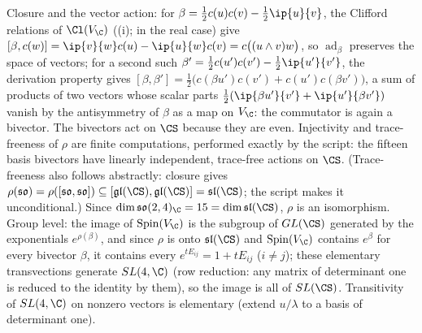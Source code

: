 Closure and the vector action: for $\beta = \tfrac12 c(u)c(v) - \tfrac12\ip{u}{v}$, the Clifford relations of $\Cl(V_\C)$ ((i);  in the real case) give $[\beta, c(w)] = \ip{v}{w}c(u) - \ip{u}{w}c(v) = c\bigl((u\wedge v)w\bigr)$, so $\operatorname{ad}_\beta$ preserves the space of vectors; for a second such $\beta'= \tfrac12 c(u')c(v') - \tfrac12\ip{u'}{v'}$, the derivation property gives $[\beta, \beta'] = \tfrac12\bigl(c(\beta u')c(v') + c(u')c(\beta v')\bigr)$, a sum of products of two vectors whose scalar parts $\tfrac12(\ip{\beta u'}{v'} + \ip{u'}{\beta v'})$ vanish by the antisymmetry of $\beta$ as a map on $V_\C$: the commutator is again a bivector. The bivectors act on $\CS$ because they are even. Injectivity and trace-freeness of $\rho$ are finite computations, performed exactly by the script: the fifteen basis bivectors have linearly independent, trace-free actions on $\CS$. (Trace-freeness also follows abstractly: closure gives $\rho(\mathfrak{so}) = \rho([\mathfrak{so},\mathfrak{so}]) \subseteq [\mathfrak{gl}(\CS), \mathfrak{gl}(\CS)] = \mathfrak{sl}(\CS)$; the script makes it unconditional.) Since $\dim \mathfrak{so}(2,4)_\C = 15 = \dim\mathfrak{sl}(\CS)$, $\rho$ is an isomorphism. Group level: the image of $\mathrm{Spin}(V_\C)$ is the subgroup of $GL(\CS)$ generated by the exponentials $e^{\rho(\beta)}$, and since $\rho$ is onto $\mathfrak{sl}(\CS)$ and $\mathrm{Spin}(V_\C)$ contains $e^{\beta}$ for every bivector $\beta$, it contains every $e^{tE_{ij}} = 1 + tE_{ij}$ ($i \neq j$); these elementary transvections generate $SL(4,\C)$ (row reduction: any matrix of determinant one is reduced to the identity by them), so the image is all of $SL(\CS)$. Transitivity of $SL(4,\C)$ on nonzero vectors is elementary (extend $u/\lambda$ to a basis of determinant one).
